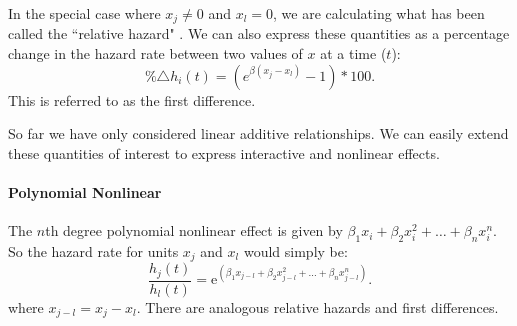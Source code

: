\documentclass[nojss]{jss}\usepackage{graphicx, color}
\begin{document}
In the special case where $x_{j} \neq 0$ and $x_{l} = 0$, we are calculating what has been called the ``relative hazard" \cite[see][]{Golub2007,Licht2011}. We can also express these quantities as a percentage change in the hazard rate between two values of $x$ at a time ($t$):
%
\begin{equation}
	\%\triangle h_{i}(t) = (e^{\beta(x_{j} - x_{l})} - 1) * 100.
\end{equation}
% 
This is referred to as the first difference.

So far we have only considered linear additive relationships. We can easily extend these quantities of interest to express interactive and nonlinear effects.

\paragraph{Polynomial Nonlinear}

The $n$th degree polynomial nonlinear effect is given by $\beta_{1}x_{i} + \beta_{2}x_{i}^{2} + \dots + \beta_{n}x_{i}^{n}$. So the hazard rate for units $x_{j}$ and $x_{l}$ would simply be:
%
\begin{equation}
	\frac{h_{j}(t)}{h_{l}(t)} = \mathrm{e}^{(\beta_{1}x_{j-l} + \beta_{2}x_{j-l}^{2} + \dots + \beta_{n}x_{j-l}^{n})}.
\end{equation}
%
where $x_{j-l} = x_{j} - x_{l}$. There are analogous relative hazards and first differences.


\end{document}
